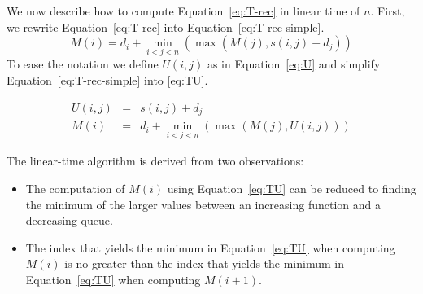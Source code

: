 

We now describe how to compute Equation~\ref{eq:T-rec} in linear time of $n$.
First, we rewrite Equation~\ref{eq:T-rec} into Equation~\ref{eq:T-rec-simple}.
\begin{equation}
M(i) = d_i + \min_{i < j < n}(\max(M(j),  s(i,j) + d_j)) \label{eq:T-rec-simple}
\end{equation}
To ease the notation we define $U(i, j)$ as in Equation~\ref{eq:U} and simplify Equation~\ref{eq:T-rec-simple} into \ref{eq:TU}.

\begin{eqnarray}
U(i, j) & = & s(i,j) + d_j \label{eq:U} \\
M(i) & = & d_i + \min_{i < j < n}(\max(M(j), U(i, j))) \label{eq:TU}
\end{eqnarray}

The linear-time algorithm is derived from two observations:
\begin{itemize}
    \item The computation of $M(i)$ using Equation~\ref{eq:TU} can be reduced to finding the minimum of the larger values between an increasing function and a decreasing queue.
    \item The index that yields the minimum in Equation~\ref{eq:TU} when computing $M(i)$ is no greater than the index that yields the minimum in Equation~\ref{eq:TU} when computing $M(i + 1)$.
\end{itemize}

